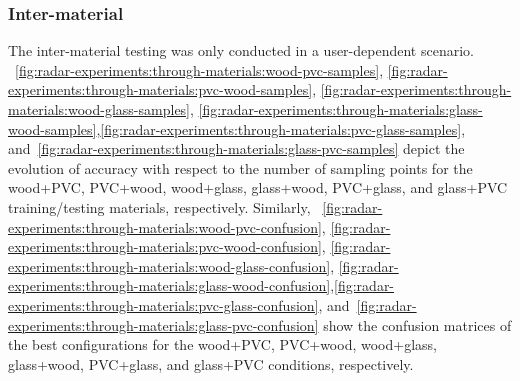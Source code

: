 



\subsubsection{Inter-material} \label{sec:radar-experiments:through-materials:results:inter-material}
The inter-material testing was only conducted in a user-dependent scenario.
%
\fig~\ref{fig:radar-experiments:through-materials:wood-pvc-samples}, \ref{fig:radar-experiments:through-materials:pvc-wood-samples}, \ref{fig:radar-experiments:through-materials:wood-glass-samples}, \ref{fig:radar-experiments:through-materials:glass-wood-samples},\ref{fig:radar-experiments:through-materials:pvc-glass-samples}, and~\ref{fig:radar-experiments:through-materials:glass-pvc-samples} depict the evolution of accuracy with respect to the number of sampling points for the wood+PVC, PVC+wood, wood+glass, glass+wood, PVC+glass, and glass+PVC training/testing materials, respectively.
%
Similarly, \fig~\ref{fig:radar-experiments:through-materials:wood-pvc-confusion}, \ref{fig:radar-experiments:through-materials:pvc-wood-confusion}, \ref{fig:radar-experiments:through-materials:wood-glass-confusion}, \ref{fig:radar-experiments:through-materials:glass-wood-confusion},\ref{fig:radar-experiments:through-materials:pvc-glass-confusion}, and~\ref{fig:radar-experiments:through-materials:glass-pvc-confusion} show the confusion matrices of the best configurations for the wood+PVC, PVC+wood, wood+glass, glass+wood, PVC+glass, and glass+PVC conditions, respectively. 

